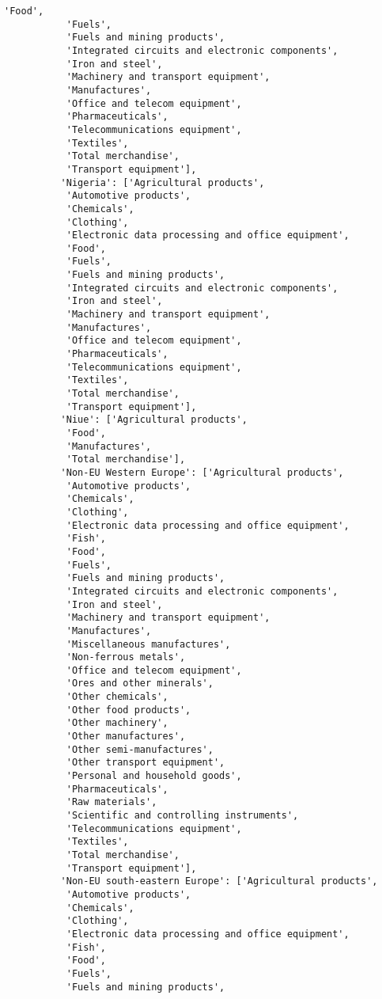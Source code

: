 \documentclass[11pt]{article}
\begin{document}
\begin{Verbatim}[commandchars=\\\{\}]
           'Food',
           'Fuels',
           'Fuels and mining products',
           'Integrated circuits and electronic components',
           'Iron and steel',
           'Machinery and transport equipment',
           'Manufactures',
           'Office and telecom equipment',
           'Pharmaceuticals',
           'Telecommunications equipment',
           'Textiles',
           'Total merchandise',
           'Transport equipment'],
          'Nigeria': ['Agricultural products',
           'Automotive products',
           'Chemicals',
           'Clothing',
           'Electronic data processing and office equipment',
           'Food',
           'Fuels',
           'Fuels and mining products',
           'Integrated circuits and electronic components',
           'Iron and steel',
           'Machinery and transport equipment',
           'Manufactures',
           'Office and telecom equipment',
           'Pharmaceuticals',
           'Telecommunications equipment',
           'Textiles',
           'Total merchandise',
           'Transport equipment'],
          'Niue': ['Agricultural products',
           'Food',
           'Manufactures',
           'Total merchandise'],
          'Non-EU Western Europe': ['Agricultural products',
           'Automotive products',
           'Chemicals',
           'Clothing',
           'Electronic data processing and office equipment',
           'Fish',
           'Food',
           'Fuels',
           'Fuels and mining products',
           'Integrated circuits and electronic components',
           'Iron and steel',
           'Machinery and transport equipment',
           'Manufactures',
           'Miscellaneous manufactures',
           'Non-ferrous metals',
           'Office and telecom equipment',
           'Ores and other minerals',
           'Other chemicals',
           'Other food products',
           'Other machinery',
           'Other manufactures',
           'Other semi-manufactures',
           'Other transport equipment',
           'Personal and household goods',
           'Pharmaceuticals',
           'Raw materials',
           'Scientific and controlling instruments',
           'Telecommunications equipment',
           'Textiles',
           'Total merchandise',
           'Transport equipment'],
          'Non-EU south-eastern Europe': ['Agricultural products',
           'Automotive products',
           'Chemicals',
           'Clothing',
           'Electronic data processing and office equipment',
           'Fish',
           'Food',
           'Fuels',
           'Fuels and mining products',

\end{Verbatim}
\end{document}
